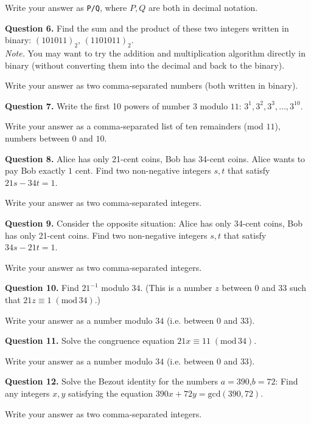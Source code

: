 \documentclass[jou]{apa6}
\begin{document}
Write your answer as {\tt P/Q}, where $P,Q$ are both in decimal notation. 

{\bf Question 6.} Find the sum and the product of these two integers written in binary: 
$(101011)_2$, $(1101011)_2$.\\
{\em Note.} You may want to try the addition and multiplication algorithm directly in 
binary (without converting them into the decimal and back to the binary).

Write your answer as two comma-separated numbers (both written in binary). 

{\bf Question 7.} Write the first 10 powers of number $3$ modulo $11$: $3^1,3^2,3^3,\ldots,3^{10}$. 

Write your answer as a comma-separated list of ten remainders (mod $11$), \textendash{} numbers between $0$ and $10$.


{\bf Question 8.} Alice has only 21-cent coins, 
Bob has 34-cent coins. Alice wants to pay Bob exactly $1$ cent. 
Find two non-negative integers $s,t$ that satisfy $21s - 34t = 1$. 

Write your answer as two comma-separated integers. 

{\bf Question 9.} Consider the opposite situation: Alice has only 34-cent coins, 
Bob has only 21-cent coins. Find two non-negative integers 
$s,t$ that satisfy $34s - 21t = 1$. 

Write your answer as two comma-separated integers. 

{\bf Question 10.} Find $21^{-1}$ modulo $34$. (This is a number $z$ between $0$ and $33$ such that
$21z \equiv 1\;(\text{mod}\,34)$.)

Write your answer as a number modulo $34$ (i.e. between $0$ and $33$). 

{\bf Question 11.} Solve the congruence equation $21x \equiv 11\;(\text{mod}\,34)$. 

Write your answer as a number modulo $34$ (i.e. between $0$ and $33$). 

{\bf Question 12.} Solve the Bezout identity for the numbers $a=390$,$b=72$: Find any integers $x,y$
satisfying the equation $390x + 72y = \text{gcd}(390,72)$. 

Write your answer as two comma-separated integers.
\end{document}
